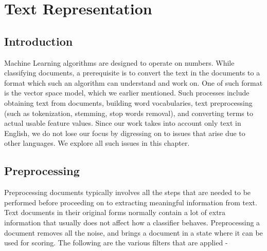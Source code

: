 \chapter{Text Representation}
\label{chapter:Text Representation}

\section{Introduction}
Machine Learning algorithms are designed to operate on numbers. While classifying documents, a prerequisite is to convert the text in the documents to a format which such an algorithm can understand and work on. One of such format is the vector space model, which we earlier mentioned. Such processes include obtaining text from documents, building word vocabularies, text preprocessing (such as tokenization, stemming, stop words removal), and converting terms to actual usable feature values. Since our work takes into account only text in English, we do not lose our focus by digressing on to issues that arise due to other languages. We explore all such issues in this chapter.

\section{Preprocessing}
Preprocessing documents typically involves all the steps that are needed to be performed before proceeding on to extracting meaningful information from text. Text documents in their original forms normally contain a lot of extra information that usually does not affect how a classifier behaves. Preprocessing a document removes all the noise, and brings a document in a state where it can be used for scoring. The following are the various filters that are applied -

